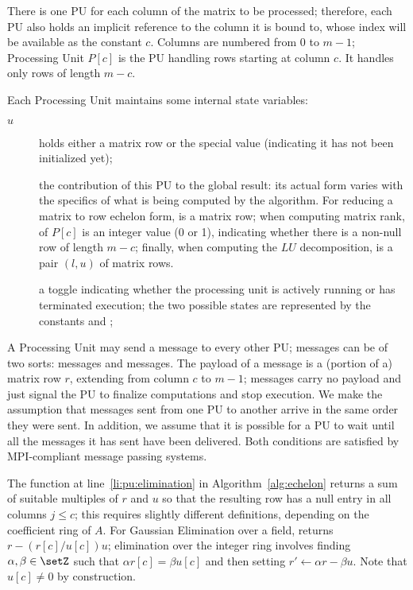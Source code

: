 There is one PU for each column of the matrix to be processed;
therefore, each PU also holds an implicit reference to the column it
is bound to, whose index will be available as the constant $c$.
Columns are numbered from 0 to $m-1$; Processing Unit $P[c]$ is the PU
handling rows starting at column $c$. It handles only rows of
length $m - c$.

Each Processing Unit maintains some internal state variables:
\begin{description}
\item[$u$] holds either a matrix row or the special value 
  (indicating it has not been initialized yet);
\item[] the contribution of this PU to the global result:
  its actual form varies with the specifics of what is being computed
  by the algorithm.  For reducing a matrix to row echelon form,
   is a matrix row; when computing matrix rank, 
  of $P[c]$ is an integer value (0 or 1), indicating whether there is
  a non-null row of length $m-c$; finally, when computing the $LU$
  decomposition,  is a pair $(l, u)$ of matrix rows.
\item[] a toggle indicating whether the processing unit is
  actively running or has terminated execution; the two possible states
  are represented by the constants  and ;
\end{description}

A Processing Unit may send a message to every other PU; messages can
be of two sorts:  messages and  messages.  The
payload of a  message is a (portion of a) matrix row $r$, extending from
column $c$ to $m-1$;  messages carry no payload and just
signal the PU to finalize computations and stop execution.  We make
the assumption that messages sent from one PU to another arrive in the
same order they were sent.  In addition, we assume that it is possible
for a PU to wait until all the messages it has sent have been
delivered.  Both conditions are satisfied by MPI-compliant message
passing systems.

The  function at line~\ref{li:pu:elimination} in
Algorithm~\ref{alg:echelon} returns a sum of suitable multiples of $r$
and $u$ so that the resulting row has a null entry in all columns $j
\leq c$; this requires slightly different definitions, depending on
the coefficient ring of $A$.  For Gaussian Elimination over a field,
 returns $r - (r[c] / u[c]) u$; elimination over the
integer ring involves finding $\alpha, \beta \in \setZ$ such that $\alpha
r[c] = \beta u[c]$ and then setting $r' \gets \alpha r - \beta u$.
Note that $u[c] \not= 0$ by construction.

